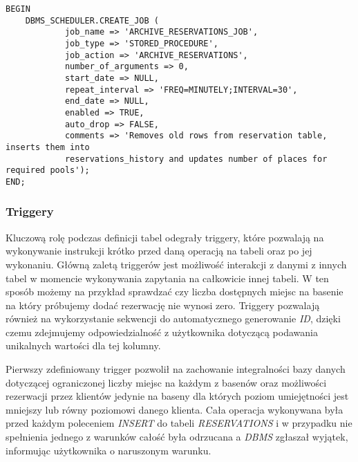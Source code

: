 \documentclass[a4paper]{article}
\begin{document}
\begin{verbatim}
BEGIN
    DBMS_SCHEDULER.CREATE_JOB (
            job_name => 'ARCHIVE_RESERVATIONS_JOB',
            job_type => 'STORED_PROCEDURE',
            job_action => 'ARCHIVE_RESERVATIONS',
            number_of_arguments => 0,
            start_date => NULL,
            repeat_interval => 'FREQ=MINUTELY;INTERVAL=30',
            end_date => NULL,
            enabled => TRUE,
            auto_drop => FALSE,
            comments => 'Removes old rows from reservation table, inserts them into
            reservations_history and updates number of places for required pools');
END;
\end{verbatim}

\subsubsection{Triggery}

Kluczową rolę podczas definicji tabel odegrały triggery, które pozwalają na wykonywanie instrukcji krótko przed daną operacją na tabeli oraz po jej wykonaniu. Główną zaletą triggerów jest możliwość interakcji z danymi z innych tabel w momencie wykonywania zapytania na całkowicie innej tabeli. W ten sposób możemy na przykład sprawdzać czy liczba dostępnych miejsc na basenie na który próbujemy dodać rezerwację nie wynosi zero. Triggery pozwalają również na wykorzystanie sekwencji do automatycznego generowanie \textit{ID}, dzięki czemu zdejmujemy odpowiedzialność z użytkownika dotyczącą podawania unikalnych wartości dla tej kolumny.

Pierwszy zdefiniowany trigger pozwolił na zachowanie integralności bazy danych dotyczącej ograniczonej liczby miejsc na każdym z basenów oraz możliwości rezerwacji przez klientów jedynie na baseny dla których poziom umiejętności jest mniejszy lub równy poziomowi danego klienta. Cała operacja wykonywana była przed każdym poleceniem \textit{INSERT} do tabeli \textit{RESERVATIONS} i w przypadku nie spełnienia jednego z warunków całość była odrzucana a \textit{DBMS} zgłaszał wyjątek, informując użytkownika o naruszonym warunku.

\newpage
\end{document}
